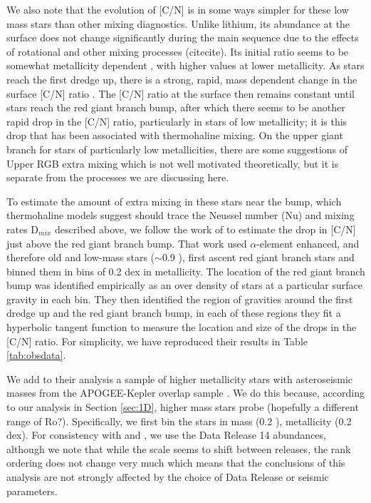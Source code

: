 We also note that the evolution of [C/N] is in some ways simpler for these low mass stars than other mixing diagnostics. Unlike lithium, its abundance at the surface does not change significantly during the main sequence due to the effects of rotational and other mixing processes (citecite). Its initial ratio seems to be somewhat metallicity dependent \citep{Shetrone2019, JackandMarcifSubmitted}, with higher values at lower metallicity. As stars reach the first dredge up, there is a strong, rapid, mass dependent change in the surface [C/N] ratio \citep{MasseronGilmore2015, Martig2016, Ness2016, Spoo2022, maybeotherstufffromtaylorspaper}. The [C/N] ratio at the surface then remains constant until stars reach the red giant branch bump, after which there seems to be another rapid drop in the [C/N] ratio, particularly in stars of low metallicity; it is this drop that has been associated with thermohaline mixing. On the upper giant branch for stars of particularly low metallicities, there are some suggestions of Upper RGB extra mixing \citep{Shetrone2019} which is not well motivated theoretically, but it is separate from the processes we are discussing here.

To estimate the amount of extra mixing in these stars near the bump, which thermohaline models suggest should trace the Neussel number (Nu) and mixing rates D$_{mix}$ described above, we follow the work of \citet{Shetrone2019} to estimate the drop in [C/N] just above the red giant branch bump. That work used $\alpha$-element enhanced, and therefore old and low-mass stars ($\sim$0.9 \msun), first ascent red giant branch stars and binned them in bins of 0.2 dex in metallicity. The location of the red giant branch bump was identified empirically as an over density of stars at a particular surface gravity in each bin. They then identified the region of gravities around the first dredge up and the red giant branch bump, in each of these regions they fit a hyperbolic tangent function to measure the location and size of the drops in the [C/N] ratio. For simplicity, we have reproduced their results in Table \ref{tab:obsdata}. 

We add to their analysis a sample of higher metallicity stars with asteroseismic masses from the APOGEE-Kepler overlap sample \citep{Pinsonneault2014, Pinsonneault2018}. We do this because, according to our analysis in Section \ref{sec:1D}, higher mass stars probe (hopefully a different range of Ro?). Specifically, we first bin the stars in mass (0.2 \msun), metallicity (0.2 dex). For consistency with \citet{Pinsonneault2018} and \citet{Shetrone2019}, we use the Data Release 14 \citet{DR14} abundances, although we note that while the scale seems to shift between releases, the rank ordering does not change very much \citep{Spoo2022} which means that the conclusions of this analysis are not strongly affected by the choice of Data Release or seismic parameters.

